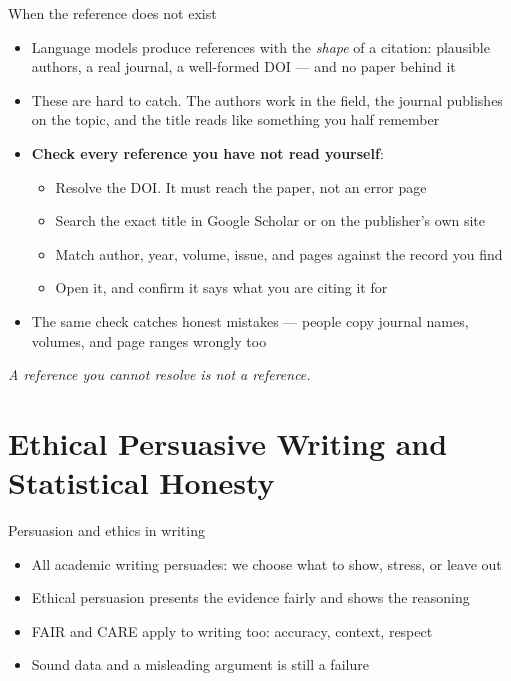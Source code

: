 \documentclass[aspectratio=169]{beamer}
\begin{document}
\begin{frame}{When the reference does not exist}
\begin{itemize}
  \item Language models produce references with the \emph{shape} of a
    citation: plausible authors, a real journal, a well-formed DOI --- and no
    paper behind it
  \item These are hard to catch.  The authors work in the field, the journal
    publishes on the topic, and the title reads like something you half
    remember
  \item \textbf{Check every reference you have not read yourself}:
    \begin{itemize}
      \item Resolve the DOI.  It must reach the paper, not an error page
      \item Search the exact title in Google Scholar or on the publisher's
        own site
      \item Match author, year, volume, issue, and pages against the record
        you find
      \item Open it, and confirm it says what you are citing it for
    \end{itemize}
  \item The same check catches honest mistakes --- people copy journal names,
    volumes, and page ranges wrongly too
\end{itemize}
\medskip
\textit{A reference you cannot resolve is not a reference.}
\end{frame}


\section{Ethical Persuasive Writing and Statistical Honesty}

\begin{frame}{Persuasion and ethics in writing}
\begin{itemize}
  \item All academic writing persuades: we choose what to show, stress, or leave out
  \item Ethical persuasion presents the evidence fairly and shows the reasoning
  \item FAIR and CARE apply to writing too: accuracy, context, respect
  \item Sound data and a misleading argument is still a failure
\end{itemize}
\end{frame}
\end{document}
